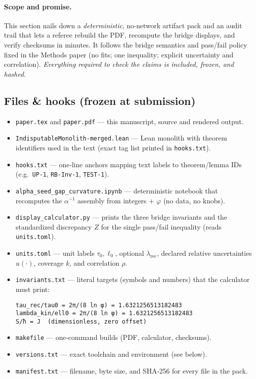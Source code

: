 \documentclass[11pt]{article}
\begin{document}
\paragraph{Scope and promise.}
This section nails down a \emph{deterministic}, no‑network artifact pack and an audit trail that lets a referee rebuild the PDF, recompute the bridge displays, and verify checksums in minutes. It follows the bridge semantics and pass/fail policy fixed in the Methods paper (no fits; one inequality; explicit uncertainty and correlation). \emph{Everything required to check the claims is included, frozen, and hashed.}

\subsection*{Files \& hooks (frozen at submission)}
\begin{itemize}
  \item \texttt{paper.tex} and \texttt{paper.pdf} — this manuscript, source and rendered output.
  \item \texttt{IndisputableMonolith-merged.lean} — Lean monolith with theorem identifiers used in the text (exact tag list printed in \texttt{hooks.txt}).
  \item \texttt{hooks.txt} — one‑line anchors mapping text labels to theorem/lemma IDs (e.g.\ \texttt{UP-1}, \texttt{RB-Inv-1}, \texttt{TEST-1}).
  \item \texttt{alpha\_seed\_gap\_curvature.ipynb} — deterministic notebook that recomputes the \(\alpha^{-1}\) assembly from integers + \(\varphi\) (no data, no knobs).
  \item \texttt{display\_calculator.py} — prints the three bridge invariants and the standardized discrepancy \(Z\) for the single pass/fail inequality (reads \texttt{units.toml}).
  \item \texttt{units.toml} — unit labels \(\tau_{0},\ell_{0}\), optional \(\lambda_{\mathrm{rec}}\), declared relative uncertainties \(u(\cdot)\), coverage \(k\), and correlation \(\rho\).
  \item \texttt{invariants.txt} — literal targets (symbols and numbers) that the calculator must print:
\begin{verbatim}
tau_rec/tau0 = 2π/(8 ln φ) = 1.6321256513182483
lambda_kin/ell0 = 2π/(8 ln φ) = 1.6321256513182483
S/ħ = J  (dimensionless, zero offset)
\end{verbatim}
  \item \texttt{makefile} — one‑command builds (PDF, calculator, checksums).
  \item \texttt{versions.txt} — exact toolchain and environment (see below).
  \item \texttt{manifest.txt} — filename, byte size, and SHA‑256 for every file in the pack.
\end{itemize}
\end{document}

